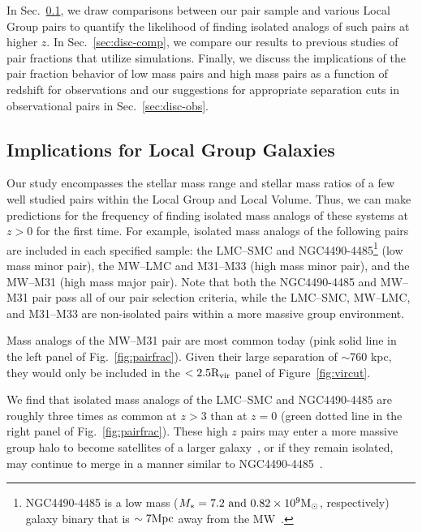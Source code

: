 \documentclass[twocolumn]{aastex631}
\newcommand{\Rvir}{\ensuremath{\rm R_{vir}}}
\begin{document}
In Sec.~\ref{sec:disc-LG}, we draw comparisons between our pair sample and various Local Group pairs to quantify the likelihood of finding isolated analogs of such pairs at higher $z$.
In Sec.~\ref{sec:disc-comp}, we compare our results to previous studies of pair fractions that utilize simulations. 
Finally, we discuss the implications of the pair fraction behavior of low mass pairs and high mass pairs as a function of redshift for observations and our suggestions for appropriate separation cuts in observational pairs in Sec.~\ref{sec:disc-obs}.

   \subsection{Implications for Local Group Galaxies}\label{sec:disc-LG}
    Our study encompasses the stellar mass range and stellar mass ratios of a few well studied pairs within the Local Group and Local Volume.
    Thus, we can make predictions for the frequency of finding isolated mass analogs of these systems at $z>0$ for the first time. 
    For example, isolated mass analogs of the following pairs are included in each specified sample:
    the LMC--SMC and NGC4490-4485\footnote{NGC4490-4485 is a low mass ($M_* = 7.2 \mbox{ and } 0.82 \times 10^9\mathrm{M}_\odot$, respectively) galaxy binary that is $\sim7\mathrm{Mpc}$ away from the MW~\citep{Theureau2007,Pearson2018}.} (low mass minor pair), the MW--LMC and M31--M33 (high mass minor pair), and the MW--M31 (high mass major pair).
    Note that both the NGC4490-4485 and MW--M31 pair pass all of our pair selection criteria, while the LMC--SMC,  MW--LMC, and M31--M33 are non-isolated pairs within a more massive group environment.

    Mass analogs of the MW--M31 pair are most common today (pink solid line in the left panel of Fig.~\ref{fig:pairfrac}). 
    Given their large separation of $\sim$760 kpc, they would only be included in the $<2.5\Rvir$ panel of Figure~\ref{fig:vircut}. 

    We find that isolated mass analogs of the LMC--SMC and NGC4490-4485 are roughly three times as common at $z>3$ than at $z=0$ (green dotted line in the right panel of Fig.~\ref{fig:pairfrac}). 
    These high $z$ pairs may enter a more massive group halo to become satellites of a larger galaxy~\citep[like the LMC--SMC, ][]{Besla2007,Patel2017a-Orbits}, or if they remain isolated, may continue to merge in a manner similar to NGC4490-4485~\citep{Pearson2018}. 
    
\end{document}
